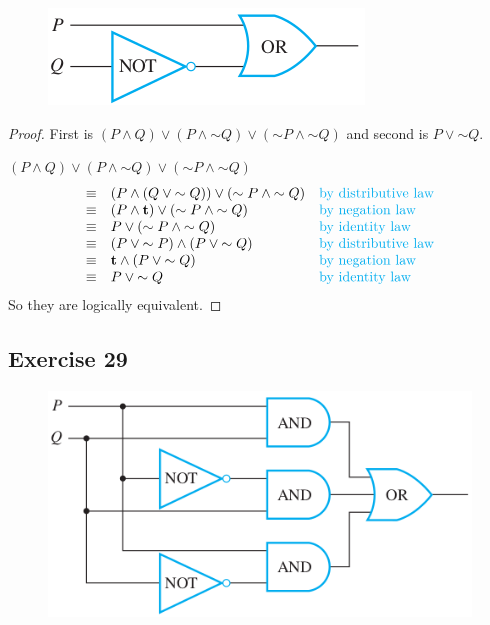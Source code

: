 \documentclass[14pt]{extarticle}
\begin{document}
\begin{figure}[ht!] \centering
\includegraphics[scale=0.5]{../images/2.4.28.b.png} \end{figure}

\begin{proof} First is $(P \wedge Q) \vee (P \wedge {\sim Q}) \vee ({\sim P}
\wedge {\sim Q})$ and second is $P \vee {\sim Q}$.

$(P \wedge Q) \vee (P \wedge {\sim Q}) \vee ({\sim P} \wedge {\sim Q})$ $$
\begin{array}{cll} \equiv & (P \wedge (Q \vee {\sim Q})) \vee ({\sim P} \wedge
{\sim Q}) & \text{\color{cyan}by distributive law} \\ \equiv & (P \wedge {\bf t})
\vee ({\sim P} \wedge {\sim Q}) & \text{\color{cyan}by negation law} \\ \equiv &
P \vee ({\sim P} \wedge {\sim Q}) & \text{\color{cyan}by identity law} \\ \equiv
& (P \vee {\sim P}) \wedge (P \vee {\sim Q}) & \text{\color{cyan}by distributive
law} \\ \equiv & {\bf t} \wedge (P \vee {\sim Q}) & \text{\color{cyan}by negation
law} \\ \equiv & P \vee {\sim Q} & \text{\color{cyan}by identity law} \\
\end{array} $$ So they are logically equivalent. \end{proof}

\subsection{Exercise 29} \begin{figure}[ht!] \centering
\includegraphics[scale=0.5]{../images/2.4.29.a.png} \end{figure}
\end{document}
